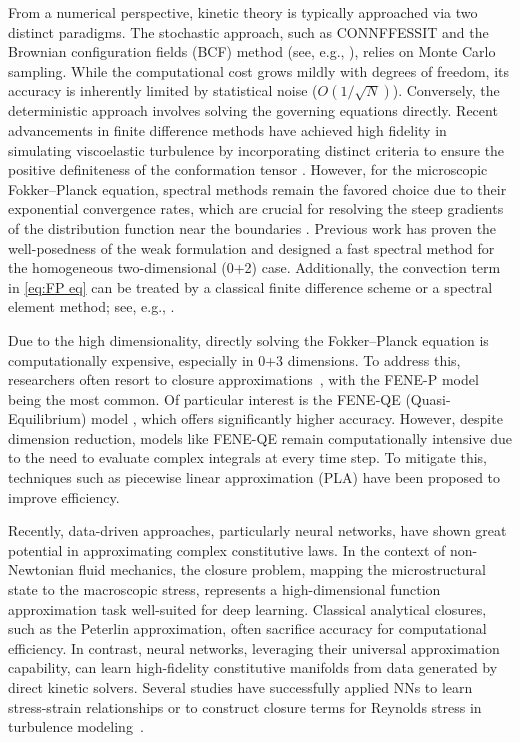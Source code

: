 \documentclass[preprint,12pt]{elsarticle}
\begin{document}
From a numerical perspective, kinetic theory is typically approached via two distinct paradigms. The stochastic approach, such as CONNFFESSIT and the Brownian configuration fields (BCF) method (see, e.g., \cite{Hulsen97,Laso93}), relies on Monte Carlo sampling. While the computational cost grows mildly with degrees of freedom, its accuracy is inherently limited by statistical noise ($O(1/\sqrt{N})$). Conversely, the deterministic approach involves solving the governing equations directly. Recent advancements in finite difference methods have achieved high fidelity in simulating viscoelastic turbulence by incorporating distinct criteria to ensure the positive definiteness of the conformation tensor \cite{Liu22}. However, for the microscopic Fokker--Planck equation, spectral methods remain the favored choice due to their exponential convergence rates, which are crucial for resolving the steep gradients of the distribution function near the boundaries \cite{LiuC21,LiuC24,Shen12}. Previous work \cite{Shen12} has proven the well-posedness of the weak formulation and designed a fast spectral method for the homogeneous two-dimensional (0+2) case. Additionally, the convection term in \eqref{eq:FP eq} can be treated by a classical finite difference scheme or a spectral element method; see, e.g., \cite{Barrett09,Chauviere04b}.

Due to the high dimensionality, directly solving the Fokker--Planck equation is computationally expensive, especially in 0+3 dimensions. To address this, researchers often resort to closure approximations~\cite{Du05}, with the FENE-P model \cite{Bird87} being the most common. Of particular interest is the FENE-QE (Quasi-Equilibrium) model \cite{Ilg02}, which offers significantly higher accuracy. However, despite dimension reduction, models like FENE-QE remain computationally intensive due to the need to evaluate complex integrals at every time step. To mitigate this, techniques such as piecewise linear approximation (PLA) \cite{Wang08} have been proposed to improve efficiency.

Recently, data-driven approaches, particularly neural networks, have shown great potential in approximating complex constitutive laws. In the context of non-Newtonian fluid mechanics, the closure problem, mapping the microstructural state to the macroscopic stress, represents a high-dimensional function approximation task well-suited for deep learning. Classical analytical closures, such as the Peterlin approximation, often sacrifice accuracy for computational efficiency. In contrast, neural networks, leveraging their universal approximation capability, can learn high-fidelity constitutive manifolds from data generated by direct kinetic solvers. Several studies have successfully applied NNs to learn stress-strain relationships or to construct closure terms for Reynolds stress in turbulence modeling~\cite{Brunton20,Duraisamy19,McConkey22}.
\end{document}
